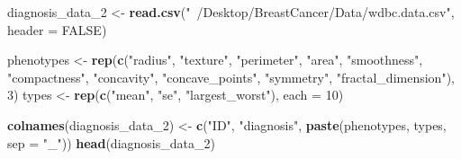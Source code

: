 \documentclass[]{article}
\newenvironment{Shaded}{\begin{snugshade}}{\end{snugshade}}
\newcommand{\KeywordTok}[1]{\textcolor[rgb]{0.13,0.29,0.53}{\textbf{#1}}}
\newcommand{\DataTypeTok}[1]{\textcolor[rgb]{0.13,0.29,0.53}{#1}}
\newcommand{\DecValTok}[1]{\textcolor[rgb]{0.00,0.00,0.81}{#1}}
\newcommand{\StringTok}[1]{\textcolor[rgb]{0.31,0.60,0.02}{#1}}
\newcommand{\OtherTok}[1]{\textcolor[rgb]{0.56,0.35,0.01}{#1}}
\newcommand{\NormalTok}[1]{#1}
\begin{document}
\begin{Shaded}
\begin{Highlighting}[]
\NormalTok{diagnosis_data_}\DecValTok{2}\NormalTok{ <-}\StringTok{ }\KeywordTok{read.csv}\NormalTok{(}\StringTok{"~/Desktop/BreastCancer/Data/wdbc.data.csv"}\NormalTok{, }\DataTypeTok{header =} \OtherTok{FALSE}\NormalTok{)}

\NormalTok{phenotypes <-}\StringTok{ }\KeywordTok{rep}\NormalTok{(}\KeywordTok{c}\NormalTok{(}\StringTok{"radius"}\NormalTok{, }\StringTok{"texture"}\NormalTok{, }\StringTok{"perimeter"}\NormalTok{, }\StringTok{"area"}\NormalTok{, }\StringTok{"smoothness"}\NormalTok{, }\StringTok{"compactness"}\NormalTok{, }\StringTok{"concavity"}\NormalTok{, }\StringTok{"concave_points"}\NormalTok{, }\StringTok{"symmetry"}\NormalTok{, }\StringTok{"fractal_dimension"}\NormalTok{), }\DecValTok{3}\NormalTok{)}
\NormalTok{types <-}\StringTok{ }\KeywordTok{rep}\NormalTok{(}\KeywordTok{c}\NormalTok{(}\StringTok{"mean"}\NormalTok{, }\StringTok{"se"}\NormalTok{, }\StringTok{"largest_worst"}\NormalTok{), }\DataTypeTok{each =} \DecValTok{10}\NormalTok{)}

\KeywordTok{colnames}\NormalTok{(diagnosis_data_}\DecValTok{2}\NormalTok{) <-}\StringTok{ }\KeywordTok{c}\NormalTok{(}\StringTok{"ID"}\NormalTok{, }\StringTok{"diagnosis"}\NormalTok{, }\KeywordTok{paste}\NormalTok{(phenotypes, types, }\DataTypeTok{sep =} \StringTok{"_"}\NormalTok{))}
\KeywordTok{head}\NormalTok{(diagnosis_data_}\DecValTok{2}\NormalTok{)}
\end{Highlighting}
\end{Shaded}
\end{document}
